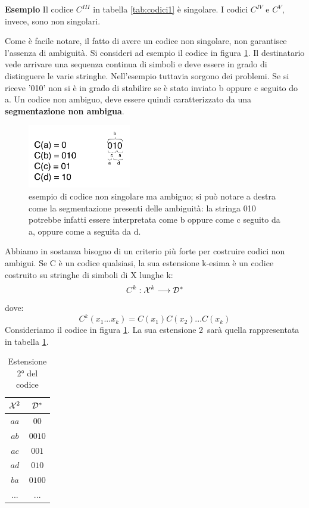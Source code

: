 \noindent
\textbf{Esempio}
Il codice \(C^{III}\) in tabella \ref{tab:codici1} è singolare. I codici $C^{IV}$ e $C^{V}$, invece, sono non singolari.

\bigskip
\noindent
Come è facile notare, il fatto di avere un codice non singolare, non garantisce l'assenza di ambiguità. Si consideri ad esempio il codice in figura \ref{fig:codice3}. Il destinatario vede arrivare una sequenza continua di simboli e deve essere in grado di distinguere le varie stringhe. Nell'esempio tuttavia sorgono dei problemi. Se si riceve '010' non si è in grado di stabilire se è stato inviato b oppure c seguito do a. Un codice non ambiguo, deve essere quindi caratterizzato da una \textbf{segmentazione non ambigua}.

\begin{figure}[htbp]
\begin{center}
	\includegraphics[width=0.4\textwidth]{img/codice3.pdf}
\caption{esempio di codice non singolare ma ambiguo; si può notare a destra come la segmentazione presenti delle ambiguità: la stringa 010 potrebbe infatti essere interpretata come b oppure come c seguito da a, oppure come a seguita da d.}
\label{fig:codice3}
\end{center}
\end{figure}

Abbiamo in sostanza bisogno di un criterio più forte per costruire codici non ambigui.
Se C è un codice qualsiasi, la sua estensione k-esima è un codice costruito su stringhe di simboli di X lunghe k:
\[C^k: \mathcal{X}^k \longrightarrow \mathcal{D}^*\]
dove:
\[C^k(x_1... x_k) = C(x_1) C(x_2) ... C(x_k)\]
Consideriamo il codice in figura \ref{fig:codice3}. La sua estensione 2\textordfeminine \ sarà quella rappresentata in tabella \ref{tab:codice4}.

\begin{table}[htbp]
  \begin{center}
   \begin{tabular}{c|c}
	$\mathcal{X}^{2}$ & $ \mathcal{D}^{*}$ \\
       \hline
	$aa$ & $00$ \\ 
	$ab$ & $0010$ \\ 
	$ac$ & $001$ \\ 
        $ad$ & $010$ \\ 
        $ba$ & $0100$ \\ 
        $...$ & $...$ \\ 
    \end{tabular}
     
     \caption{Estensione 2° del codice}
    \label{tab:codice4}
  \end{center}
\end{table}

